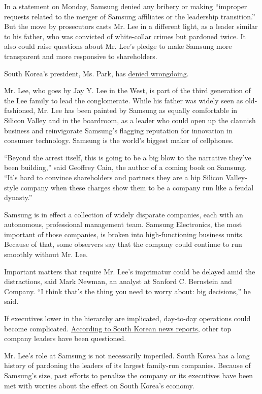 In a statement on Monday, Samsung denied any bribery or making
``improper requests related to the merger of Samsung affiliates or the
leadership transition.'' But the move by prosecutors casts Mr. Lee in a
different light, as a leader similar to his father, who was convicted of
white-collar crimes but pardoned twice. It also could raise questions
about Mr. Lee's pledge to make Samsung more transparent and more
responsive to shareholders.

South Korea's president, Ms. Park, has
\href{https://www.nytimes.com/2017/01/15/world/asia/south-korea-samsung-arrest-jay-lee-park-geun-hye.html}{denied
wrongdoing}.

Mr. Lee, who goes by Jay Y. Lee in the West, is part of the third
generation of the Lee family to lead the conglomerate. While his father
was widely seen as old-fashioned, Mr. Lee has been painted by Samsung as
equally comfortable in Silicon Valley and in the boardroom, as a leader
who could open up the clannish business and reinvigorate Samsung's
flagging reputation for innovation in consumer technology. Samsung is
the world's biggest maker of cellphones.

``Beyond the arrest itself, this is going to be a big blow to the
narrative they've been building,'' said Geoffrey Cain, the author of a
coming book on Samsung. ``It's hard to convince shareholders and
partners they are a hip Silicon Valley-style company when these charges
show them to be a company run like a feudal dynasty.''

Samsung is in effect a collection of widely disparate companies, each
with an autonomous, professional management team. Samsung Electronics,
the most important of those companies, is broken into high-functioning
business units. Because of that, some observers say that the company
could continue to run smoothly without Mr. Lee.

Important matters that require Mr. Lee's imprimatur could be delayed
amid the distractions, said Mark Newman, an analyst at Sanford C.
Bernstein and Company. ``I think that's the thing you need to worry
about: big decisions,'' he said.

If executives lower in the hierarchy are implicated, day-to-day
operations could become complicated.
\href{http://english.yonhapnews.co.kr/news/2017/01/16/0200000000AEN20170116001453315.html}{According
to South Korean news reports}, other top company leaders have been
questioned.

Mr. Lee's role at Samsung is not necessarily imperiled. South Korea has
a long history of pardoning the leaders of its largest family-run
companies. Because of Samsung's size, past efforts to penalize the
company or its executives have been met with worries about the effect on
South Korea's economy.


